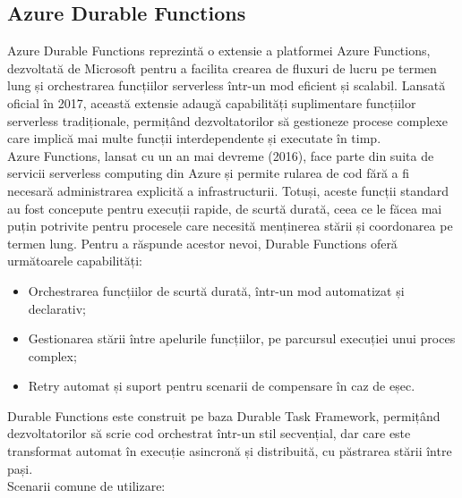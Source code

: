 \subsection{Azure Durable Functions}
{\hspace*{1cm} Azure Durable Functions reprezintă o extensie a platformei Azure Functions, dezvoltată de Microsoft pentru a facilita crearea de fluxuri de lucru pe termen lung și orchestrarea funcțiilor serverless într-un mod eficient și scalabil. Lansată oficial în 2017, această extensie adaugă capabilități suplimentare funcțiilor serverless tradiționale, permițând dezvoltatorilor să gestioneze procese complexe care implică mai multe funcții interdependente și executate în timp.}\parencite{azureDurableFunctions}\\
{\hspace*{1cm} Azure Functions, lansat cu un an mai devreme (2016), face parte din suita de servicii serverless computing din Azure și permite rularea de cod fără a fi necesară administrarea explicită a infrastructurii. Totuși, aceste funcții standard au fost concepute pentru execuții rapide, de scurtă durată, ceea ce le făcea mai puțin potrivite pentru procesele care necesită menținerea stării și coordonarea pe termen lung.}\parencite{azureDurableFunctions}
{Pentru a răspunde acestor nevoi, Durable Functions oferă următoarele capabilități:}
\begin{itemize}
    \item Orchestrarea funcțiilor de scurtă durată, într-un mod automatizat și declarativ;
    \item Gestionarea stării între apelurile funcțiilor, pe parcursul execuției unui proces complex;
    \item Retry automat și suport pentru scenarii de compensare în caz de eșec.
\end{itemize}\parencite{azureDurableFunctions}
{Durable Functions este construit pe baza Durable Task Framework, permițând dezvoltatorilor să scrie cod orchestrat într-un stil secvențial, dar care este transformat automat în execuție asincronă și distribuită, cu păstrarea stării între pași.}\parencite{azureDurableFunctions}\\
{Scenarii comune de utilizare:}
